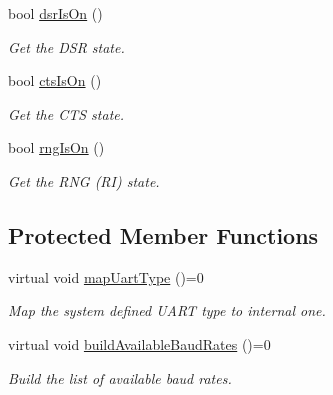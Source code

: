 \begin{DoxyCompactItemize}
bool \hyperlink{classmdt_abstract_serial_port_a76816aa53a6dce0ab30b9f1d095dd045}{dsr\-Is\-On} ()
\begin{DoxyCompactList}\small\item\em Get the D\-S\-R state. \end{DoxyCompactList}\item 
bool \hyperlink{classmdt_abstract_serial_port_a9bea314eefd6f4ec79456bc21e6c66af}{cts\-Is\-On} ()
\begin{DoxyCompactList}\small\item\em Get the C\-T\-S state. \end{DoxyCompactList}\item 
bool \hyperlink{classmdt_abstract_serial_port_a0a3954438d1e8180e53717cc0fe1ce3e}{rng\-Is\-On} ()
\begin{DoxyCompactList}\small\item\em Get the R\-N\-G (R\-I) state. \end{DoxyCompactList}\end{DoxyCompactItemize}
\subsection*{Protected Member Functions}
\begin{DoxyCompactItemize}
\item 
virtual void \hyperlink{classmdt_abstract_serial_port_abbc98ff6721f120d68b43078e90b1195}{map\-Uart\-Type} ()=0
\begin{DoxyCompactList}\small\item\em Map the system defined U\-A\-R\-T type to internal one. \end{DoxyCompactList}\item 
virtual void \hyperlink{classmdt_abstract_serial_port_a6241c9f53d60fd477e2375bd5b36073f}{build\-Available\-Baud\-Rates} ()=0
\begin{DoxyCompactList}\small\item\em Build the list of available baud rates. \end{DoxyCompactList}\end{DoxyCompactItemize}
